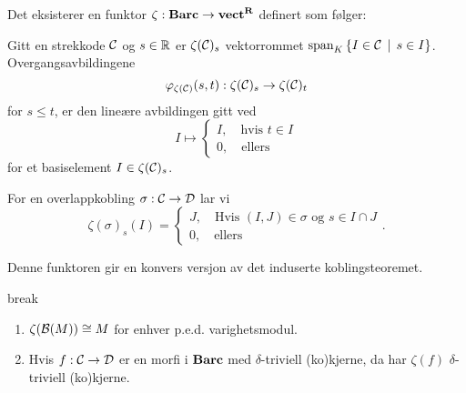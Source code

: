 \begin{definisjon}\label{def:zetafunktor}
  Det eksisterer en funktor $\zeta:\textnormal{\textbf{Barc}}\to\textnormal{\textbf{vect}}^{\textnormal{\textbf{{R}}}}$
  definert som følger:

  Gitt en strekkode $\mathcal{C}$ og $s\in\mathbb{R}$ er $\zeta(\mathcal{C})_s$
  vektorrommet $\text{span}_K\left\{I\in\mathcal{C}\,\mid\,s\in I\right\}$.
  Overgangsavbildingene
  \[\varphi_{\zeta(\mathcal{C})}(s,t):\zeta(\mathcal{C})_s\to\zeta(\mathcal{C})_t\]
  for $s\leq t$, er den lineære avbildingen gitt ved
  \[I \mapsto 
  \begin{cases}
    I,\quad \text{hvis $t\in I$}\\
    0,\quad \text{ellers}
  \end{cases}
  \]
  for et basiselement $I\in\zeta(\mathcal{C})_s$.

  For en overlappkobling $\sigma:\mathcal{C}\to\mathcal{D}$ lar vi
  \[\zeta(\sigma)_s(I) =
  \begin{cases}
    J,\quad \text{Hvis $(I,J)\in\sigma$ og $s\in I\cap
    J$}\\
    0,\quad\text{ellers}
  \end{cases}.\]
\end{definisjon}
Denne funktoren gir en konvers versjon av det induserte
koblingsteoremet.

\begin{proposisjon}{break}\label{prop:KonvIKT}
  \begin{enumerate}
    \item $\zeta(\mathcal{B}(M))\cong M$ for enhver p.e.d.
      varighetsmodul.
    \item Hvis $f:\mathcal{C}\to\mathcal{D}$ er en morfi i $\textnormal{\textbf{Barc}}$ med
      $\delta$-triviell (ko)kjerne, da har $\zeta(f)$
      $\delta$-triviell (ko)kjerne.
  \end{enumerate}
\end{proposisjon}
